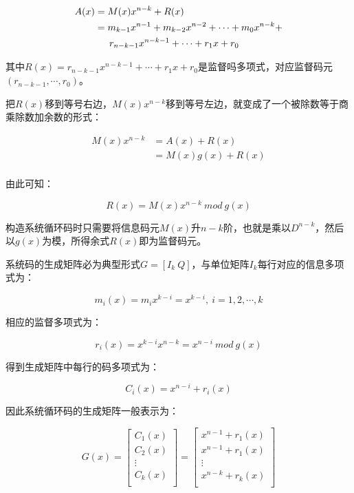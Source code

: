\documentclass[
]{article}
\begin{document}
\begin{equation}
\begin{aligned}
A(x)&=M(x)x^{n-k}+R(x)\\
    &=m_{k-1}x^{n-1}+m_{k-2}x^{n-2}+\cdots+m_0x^{n-k}+\\
    & \hspace{1.5em} r_{n-k-1}x^{n-k-1}+\cdots+r_1x+r_0\\
\end{aligned}
\end{equation}

其中$R(x)=r_{n-k-1}x^{n-k-1}+\cdots+r_1x+r_0$是监督吗多项式，对应监督码元$(r_{n-k-1},\cdots,r_{0})$。

把$R(x)$移到等号右边，$M(x)x^{n-k}$移到等号左边，就变成了一个被除数等于商乘除数加余数的形式：

\begin{equation}
\begin{aligned}
M(x)x^{n-k}&=A(x)+R(x)\\
    	&=M(x)g(x)+R(x)\\
\end{aligned}
\end{equation}

由此可知：

\begin{equation}
R(x)=M(x)x^{n-k} \: mod \: g(x)
\end{equation}

构造系统循环码时只需要将信息码元$M(x)$升$n-k$阶，也就是乘以$D^{n-k}$，然后以$g(x)$为模，所得余式$R(x)$即为监督码元。

系统码的生成矩阵必为典型形式$G=[I_k \: Q]$，与单位矩阵$I_k$每行对应的信息多项式为：

\begin{equation}
m_i(x)=m_ix^{k-i}=x^{k-i},\: i=1,2,\cdots,k
\end{equation}

相应的监督多项式为：

\begin{equation}
r_i(x)=x^{k-i}x^{n-k}=x^{n-i}\: mod \: g(x)
\end{equation}

得到生成矩阵中每行的码多项式为：

\begin{equation}
C_i(x)=x^{n-i}+r_i(x)
\end{equation}

因此系统循环码的生成矩阵一般表示为：

\begin{equation}
G(x)=
\left[
\begin{matrix}
C_1(x)\\
C_2(x)\\
 \vdots \\
C_k(x)\\
\end{matrix}
\right]
=
\left[
\begin{matrix}
x^{n-1}+r_1(x)\\
x^{n-1}+r_1(x)\\
 \vdots \\
x^{n-k}+r_k(x)\\
\end{matrix}
\right]
\end{equation}
\end{document}
